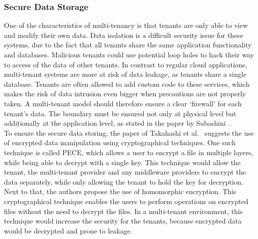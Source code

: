 \subsubsection{Secure Data Storage}
One of the characteristics of multi-tenancy is that tenants are only able to view and modify their own data.
Data isolation is a difficult security issue for these systems, due to the fact that all tenants share the same application functionality and databases. 
Malicious tenants could use potential loop holes to hack their way to access of the data of other tenants. 
In contrast to regular cloud applications, multi-tenant systems are more at risk of data leakage, as tenants share a single database.
Tenants are often allowed to add custom code to these services, which makes the risk of data intrusion even bigger when precautions are not properly taken. 
A multi-tenant model should therefore ensure a clear ‘firewall’ for each tenant’s data.
The boundary must be ensured not only at physical level but additionally at the application level, as stated in the paper by Subashini~\cite{Subashini2011Security}.\\

To ensure the secure data storing, the paper of Takahashi et al.~\cite{Takahashi2012Security} suggests the use of encrypted data manipulation using cryptographical techniques. 
One such technique is called \acf{PECE}, which allows a user to encrypt a file in multiple layers, while being able to decrypt with a single key.
This technique would allow the tenant, the multi-tenant provider and any middleware providers to encrypt the data separately, while only allowing the tenant to hold the key for decryption.
Next to that, the authors propose the use of homomorphic encryption. 
This cryptographical technique enables the users to perform operations on encrypted files without the need to decrypt the files.
In a multi-tenant environment, this technique would increase the security for the tenants, because encrypted data would be decrypted and prone to leakage.

